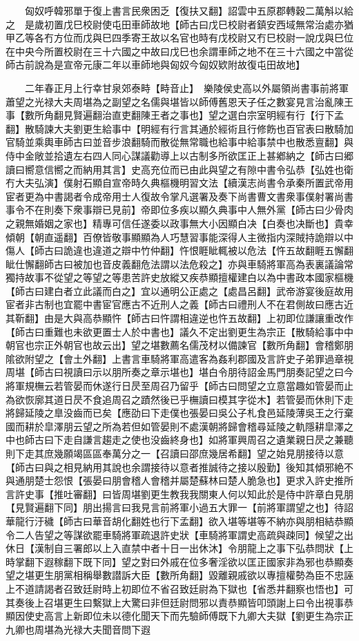 　　匈奴呼韓邪單于復上書言民衆困乏【復扶又翻】詔雲中五原郡轉穀二萬斛以給之　是歲初置戊巳校尉使屯田車師故地【師古曰戊巳校尉者鎮安西域無常治處亦猶甲乙等各冇方位而戊與巳四季寄王故以名官也時有戊校尉又冇巳校尉一說戊與巳位在中央今所置校尉在三十六國之中故曰戊巳也余謂車師之地不在三十六國之中當從師古前說為是宣帝元康二年以車師地與匈奴今匈奴欵附故復屯田故地】

　　二年春正月上行幸甘泉郊泰畤【畤音止】　樂陵侯史高以外屬領尚書事前將軍蕭望之光禄大夫周堪為之副望之名儒與堪皆以師傅舊恩天子任之數宴見言治亂陳王事【數所角翻見賢遍翻治直吏翻陳王者之事也】望之選白宗室明經有行【行下孟翻】散騎諫大夫劉更生給事中【明經有行言其通於經術且行修飭也百官表曰散騎加官騎並乘輿車師古曰並音步浪翻騎而散從無常職也給事中給事禁中也散悉亶翻】與侍中金敞並拾遺左右四人同心謀議勸導上以古制多所欲匡正上甚鄕納之【師古曰郷讀曰嚮意信嚮之而納用其言】史高充位而已由此與望之有隙中書令弘恭【弘姓也衛冇大夫弘演】僕射石顯自宣帝時久典樞機明習文法【續漢志尚書令承秦所置武帝用宦者更為中書謁者令成帝用士人復故令掌凡選署及奏下尚書曹文書衆事僕射署尚書事令不在則奏下衆事辯已見前】帝即位多疾以顯久典事中人無外黨【師古曰少骨肉之親無婚姻之家也】精專可信任遂委以政事無大小因顯白决【白奏也决斷也】貴幸傾朝【朝直遥翻】百僚皆敬事顯顯為人巧慧習事能深得人主微指内深賊持詭辯以中傷人【師古曰詭違也違道之辯中竹仲翻】忤恨睚眦輒被以危法【忤五故翻睚五懈翻眦仕懈翻師古曰被加也音皮義翻危法謂以法危殺之】亦與車騎將軍高為表裏議論常獨持故事不從望之等望之等患苦許史放縱又疾恭顯擅權建白以為中書政本國家樞機【師古曰建白者立此議而白之】宜以通明公正處之【處昌呂翻】武帝游宴後庭故用宦者非古制也宜罷中書宦官應古不近刑人之義【師古曰禮刑人不在君側故曰應古近其靳翻】由是大與高恭顯忤【師古曰忤謂相違逆也忤五故翻】上初即位謙讓重改作【師古曰重難也未欲更置士人於中書也】議久不定出劉更生為宗正【散騎給事中中朝官也宗正外朝官也故云出】望之堪數薦名儒茂材以備諫官【數所角翻】會稽鄭朋隂欲附望之【會土外翻】上書言車騎將軍高遣客為姦利郡國及言許史子弟罪過章視周堪【師古曰視讀曰示以朋所奏之章示堪也】堪白令朋待詔金馬門朋奏記望之曰今將軍規橅云若管晏而休遂行日昃至周召乃留乎【師古曰問望之立意當趣如管晏而止為欲恢廓其道日昃不食追周召之蹟然後已乎橅讀曰模其字從木】若管晏而休則下走將歸延陵之臯没齒而已矣【應劭曰下走僕也張晏曰吳公子札食邑延陵薄吳王之行棄國而耕於皐澤朋云望之所為若但如管晏則不處漢朝將歸會稽尋延陵之軌隱耕皐澤之中也師古曰下走自謙言趨走之使也没齒終身也】如將軍興周召之遺業親日昃之兼聽則下走其庶幾願竭區區奉萬分之一【召讀曰邵庶幾居希翻】望之始見朋接待以意【師古曰與之相見納用其說也余謂接待以意者推誠待之接以殷勤】後知其傾邪絶不與通朋楚士怨恨【張晏曰朋會稽人會稽并屬楚蘇林曰楚人脆急也】更求入許史推所言許史事【推吐審翻】曰皆周堪劉更生教我我關東人何以知此於是侍中許章白見朋【見賢遍翻下同】朋出揚言曰我見言前將軍小過五大罪一【前將軍謂望之也】待詔華龍行汙穢【師古曰華音胡化翻姓也行下孟翻】欲入堪等堪等不納亦與朋相結恭顯令二人告望之等謀欲罷車騎將軍疏退許史狀【車騎將軍謂史高疏與疎同】候望之出休日【漢制自三署郎以上入直禁中者十日一出休沐】令朋龍上之事下弘恭問狀【上時掌翻下遐稼翻下既下同】望之對曰外戚在位多奢淫欲以匡正國家非為邪也恭顯奏望之堪更生朋黨相稱舉數譛訴大臣【數所角翻】毀離親戚欲以專擅權勢為臣不忠誣上不道請謁者召致廷尉時上初即位不省召致廷尉為下獄也【省悉井翻察也悟也】可其奏後上召堪更生曰繫獄上大驚曰非但廷尉問邪以責恭顯皆叩頭謝上曰令出視事恭顯因使史高言上新即位未以德化聞天下而先驗師傅既下九卿大夫獄【劉更生為宗正九卿也周堪為光禄大夫聞音問下遐